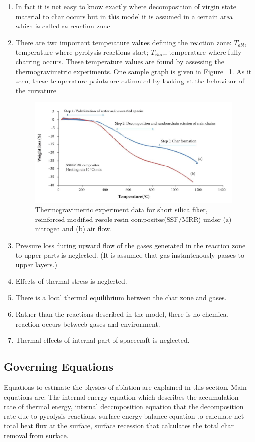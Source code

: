 \documentclass[a4paper, 12pt]{article} %
\begin{document}
\begin{enumerate}
 \item In fact it is not easy to know exactly where decomposition of virgin state material to char occurs but in this model it is assumed in a certain area which is called as reaction zone. 
 \item There are two important temperature values defining the reaction zone: $T_{abl}$, temperature where pyrolysis reactions start; $T_{char}$, temperature where fully charring occurs. These temperature values are found by assessing the thermogravimetric experiments. One sample graph is given in Figure ~\ref{fig:tga}. As it seen, these temperature points are estimated by looking at the behaviour of the curvature.
\begin{figure}[h!]
  \centering
  \includegraphics[width= \linewidth]{tga.jpg}
  \caption{Thermogravimetric experiment data for short silica fiber, reinforced modified resole resin composites(SSF/MRR) under (a) nitrogen and (b) air flow. \cite{elw}}
  \label{fig:tga}
\end{figure}
\item Pressure loss during upward flow of the gases generated in the reaction zone to upper parts is neglected. (It is assumed that gas instantenously passes to upper layers.)
\item Effects of thermal stress is neglected.
\item There is a local thermal equilibrium between the char zone and gases.
\item Rather than the reactions described in the model, there is no chemical reaction occurs betweeb gases and environment.
\item Thermal effects of internal part of spacecraft is neglected.

\end{enumerate}


\subsection{Governing Equations}
Equations to estimate the physics of ablation are explained in this section. Main equations are: The internal energy equation which describes the accumulation rate of thermal energy, internal decomposition equation that the decomposition rate due to pyrolysis reactions, surface energy balance equation to calculate net total heat flux at the surface, surface recession that calculates the total char removal from surface.
\end{document}
